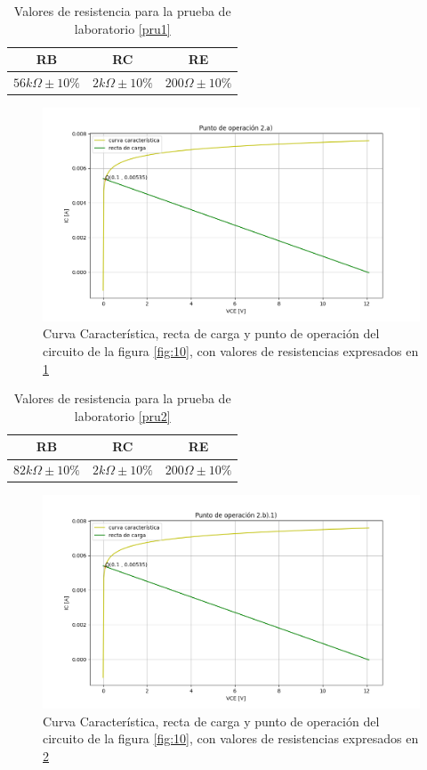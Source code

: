 \documentclass[10pt, a4paper]{article}
\begin{document}
    \newpage

    \begin{table}[h!]
        \centering
        \caption{Valores de resistencia para la prueba de laboratorio \ref{pru1}}
        \label{tab:2a}
        \begin{tabular}{|c|c|c|} \hline
            RB & RC & RE \\ \hline
            $56k\Omega \pm 10\%$ & $2k\Omega \pm 10\%$ & $200\Omega \pm 10\%$ \\ \hline
        \end{tabular}
    \end{table}

    \begin{figure}[h!]
        \centering
        \includegraphics[height=5cm\textwidth]{2a.png}
        \caption{Curva Característica, recta de carga y punto de operación del circuito de la figura \ref{fig:10}, con valores de resistencias expresados en \ref{tab:2a}}
        \label{fig:2a}
    \end{figure}

    \begin{table}[h!]
        \centering
        \caption{Valores de resistencia para la prueba de laboratorio \ref{pru2}}
        \label{tab:2b1}
        \begin{tabular}{|c|c|c|} \hline
            RB & RC & RE \\ \hline
            $82k\Omega \pm 10\%$ & $2k\Omega \pm 10\%$ & $200\Omega \pm 10\%$ \\ \hline
        \end{tabular}
    \end{table}

    \begin{figure}[h!]
        \centering
        \includegraphics[height=5cm\textwidth]{2b1.png}
        \caption{Curva Característica, recta de carga y punto de operación del circuito de la figura \ref{fig:10}, con valores de resistencias expresados en \ref{tab:2b1}}
        \label{fig:2b1}
    \end{figure}
\end{document}
